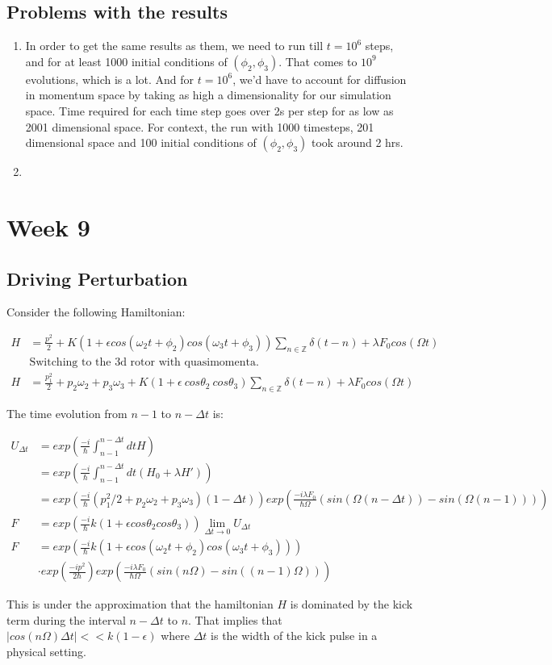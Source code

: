 \documentclass[12pt]{article}
\begin{document}
\subsection{Problems with the results}
\begin{enumerate}
    \item In order to get the same results as them, we need to run till $t = 10^6$ steps,
    and for at least 1000 initial conditions of $(\phi_2, \phi_3)$. That comes to $10^9$ evolutions,
    which is a lot. And for $t = 10^6$, we'd have to account for diffusion in momentum space by
    taking as high a dimensionality for our simulation space. Time required for each time step goes
    over 2s per step for as low as 2001 dimensional space. For context, the run with 1000 timesteps,
    201 dimensional space and 100 initial conditions of $(\phi_2,\phi_3)$ took around 2 hrs.
    
    \item 
\end{enumerate}

\section{Week 9}
\subsection{Driving Perturbation}
Consider the following Hamiltonian:

\begin{align*}
    H &= \frac{p^2}{2}
    + K (1 + \epsilon cos(\omega_2 t + \phi_2) cos(\omega_3 t + \phi_3))
    \sum_{n \in \mathbb{Z}} \delta(t - n) + \lambda F_0 cos(\Omega t) \\
    &\text{Switching to the 3d rotor with quasimomenta.} \\
    H &= \frac{p_1^2}{2} + p_2 \omega_2 + p_3 \omega_3
    + K (1 + \epsilon \ cos\theta_2 \ cos\theta_3)
    \sum_{n \in \mathbb{Z}} \delta(t - n) + \lambda F_0 cos(\Omega t)
\end{align*}

The time evolution from $n-1$ to $n-\Delta t$ is:

\begin{align*}
    U_{\Delta t} &= exp(\frac{-i}{\hbar} \int_{n-1}^{n-\Delta t} dt H) \\
    &= exp(\frac{-i}{\hbar}\int_{n-1}^{n-\Delta t} dt (H_0 + \lambda H')) \\
    &= exp(\frac{-i}{\hbar} (p_1^2/2 + p_2 \omega_2 + p_3 \omega_3)(1 - \Delta t))
    exp(\frac{-i\lambda F_0}{\hbar \Omega}(sin(\Omega (n - \Delta t)) - sin(\Omega (n-1)))) \\
    F &= exp(\frac{-i}{\hbar}k(1 + \epsilon cos\theta_2 cos\theta_3)) \lim_{\Delta t \to 0} U_{\Delta t} \\
    F &= exp(\frac{-i}{\hbar}k(1 + \epsilon cos(\omega_2 t + \phi_2) cos(\omega_3 t + \phi_3))) \\ 
    &\cdot exp(\frac{-ip^2}{2\hbar}) exp(\frac{-i\lambda F_0}{\hbar \Omega}(sin(n \Omega) - sin((n-1) \Omega ))) 
\end{align*}

This is under the approximation that the hamiltonian $H$ is
dominated by the kick term during the interval $n-\Delta t$ to $n$.
That implies that $|cos(n\Omega)\Delta t| << k (1 - \epsilon)$ where
$\Delta t$ is the width of the kick pulse in a physical setting.

\nocite{*}
\printbibliography
\end{document}
